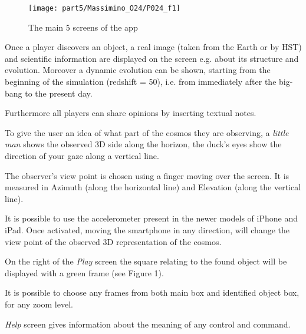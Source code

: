 \begin{figure}[h!]
\centering
\texttt{[image: part5/Massimino\_O24/P024\_f1]}
\caption{The main 5 screens of the app}
\end{figure}
Once a player discovers an object, a real image (taken from the Earth or by HST) and scientific information are displayed on the screen e.g. about its structure and evolution. Moreover a dynamic evolution can be shown, starting from the beginning of the simulation (redshift = 50), i.e. from immediately after the big-bang to the present day.\par
Furthermore all players can share opinions by inserting textual notes. \par
To give the user an idea of what part of the cosmos they are observing, a \emph{little man} shows the observed  3D side along the horizon,  the duck's eyes show the direction of your gaze along a vertical line. \par
The observer's view point  is chosen using a finger moving over the screen. It is measured in Azimuth (along the horizontal line) and Elevation (along the vertical line).\par
It is possible to use the accelerometer present in the newer models of iPhone  and iPad. Once activated, moving the smartphone in any direction, will change the view point  of the observed 3D 
representation of the cosmos.\par
On the right of the \emph{Play} screen the square relating to the found object will be displayed with a 
green frame (see Figure 1).\par
It is possible to choose any frames from both main box and identified object box, for  any zoom level.\par
\emph{Help} screen gives information about the meaning of any control and command.

